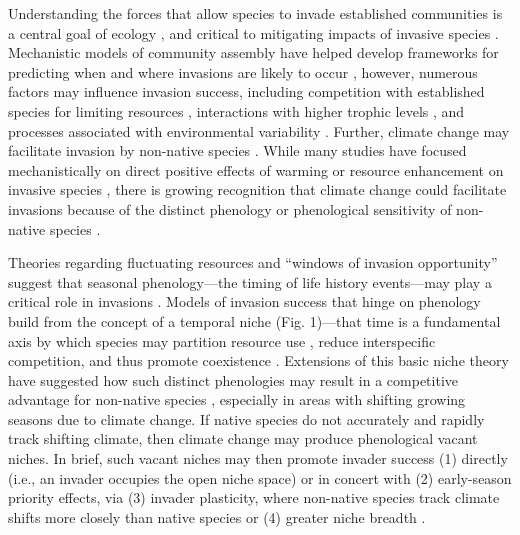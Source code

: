 \documentclass[11pt,a4paper,oneside]{article}
\begin{document}
\newpage
\linenumbers
{}

\noindent Understanding the forces that allow species to invade established communities is a central goal of ecology \citep{Elton:1958bk}, and critical to mitigating impacts of invasive species \citep{Levine:2003cn}. Mechanistic models of community assembly have helped develop frameworks for predicting when and where invasions are likely to occur \citep[e.g.,][]{Shea:2002pv}, however, numerous factors may influence invasion success, including competition with established species for limiting resources \citep{Macarthur:1970kp,tilman1982,tilman1988}, interactions with higher trophic levels \citep{Keane:2002uz,Colautti2004}, and processes associated with environmental variability \citep{chesson1981,chesson1986}. Further, climate change may facilitate invasion by non-native species \citep{dukes2011}.  While many studies have focused mechanistically on direct positive effects of warming or resource enhancement on invasive species \citep{bradley2010}, there is growing recognition that climate change could facilitate invasions because of the distinct phenology or phenological sensitivity of non-native species \citep{Willis:2010al,wolkovichAmBot2013}.  

Theories regarding fluctuating resources \citep{Davis:2000tg} and ``windows of invasion opportunity'' \citep{drake2006,caplat2010} suggest that seasonal phenology---the timing of life history events---may play a critical role in invasions \citep{wolkovich:2010fee}. Models of invasion success that hinge on phenology build from the concept of a temporal niche (Fig. 1)---that time is a fundamental axis by which species may partition resource use \citep{gotelli1996}, reduce interspecific competition, and thus promote coexistence \citep{Chesson:1997dz}. Extensions of this basic niche theory have suggested how such distinct phenologies may result in a competitive advantage for non-native species \citep{Godoy:2009dz}, especially in areas with shifting growing seasons due to climate change. If native species do not accurately and rapidly track shifting climate, then climate change may produce phenological vacant niches. In brief, such vacant niches may then promote invader success (1) directly (i.e., an invader occupies the open niche space) or in concert with (2) early-season priority effects, via (3) invader plasticity, where non-native species track climate shifts more closely than native species or (4) greater niche breadth \citep[see Fig. 1 and][]{wolkovich:2010fee}. %
\end{document}
